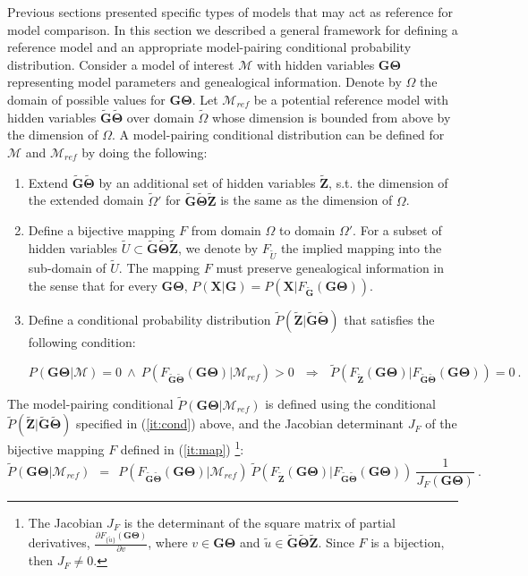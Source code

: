 \documentclass[11pt]{article}
\newcommand{\vect}[1]{\boldsymbol{\mathbf{#1}}}
\newcommand{\X}{\vect{X}}
\newcommand{\M}{\mathcal{M}}
\newcommand{\G}{\vect{G}}
\newcommand{\T}{\vect{\Theta}}
\newcommand{\GT}{\G\T}
\newcommand{\Mref}{\M_{ref}}
\newcommand{\Pref}{\widetilde{P}}
\newcommand{\Om}{\Omega}
\newcommand{\Gref}{\widetilde{\G}}
\newcommand{\Tref}{\widetilde{\T}}
\newcommand{\Z}{\vect{Z}}
\newcommand{\Zref}{\widetilde{\Z}}
\newcommand{\Omref}{\widetilde{\Om}}
\begin{document}
Previous sections presented specific types of models that may act as reference for model comparison.
%
In this section we described a general framework for defining a reference model and an appropriate model-pairing conditional
probability distribution.
%
Consider a model of interest $\M$ with hidden variables $\GT$ representing model parameters and genealogical information.
%
Denote by $\Om$  the domain of possible values for $\GT$.
%
Let $\Mref$ be a potential reference model with hidden variables $\Gref\Tref$ over domain $\Omref$ whose dimension is bounded from above by the
dimension of $\Om$.
%
A model-pairing conditional distribution can be defined for $\M$ and $\Mref$ by doing the following:
%
%
\begin{enumerate}
 \item Extend $\Gref\Tref$ by an additional set of hidden variables $\Zref$, s.t. the dimension of the extended domain $\Omref'$ for $\Gref\Tref\Zref$
 is the same as the dimension of $\Om$.
 \item \label{it:map} Define a bijective mapping $F$ from domain $\Om$ to domain $\Om'$.
 For a subset of hidden variables $\widetilde{U}\subset\Gref\Tref\Zref$, we denote by $F_{\widetilde{U}}$ the implied mapping into the sub-domain of $\widetilde{U}$.
 The mapping $F$ must preserve genealogical information in the sense that for every $\GT$, $P(\X|\G)=P(\X|F_{\Gref}(\GT))$.
  \item \label{it:cond} Define a conditional probability distribution $\Pref(\Zref|\Gref\Tref)$ that satisfies the following condition:
  \begin{small}
  \begin{equation}
  P(\GT|\M) = 0 ~\land~ P(F_{\Gref\Tref}(\GT)|\Mref) > 0 ~~~\Rightarrow~~~ \Pref(F_{\Zref}(\GT)|F_{\Gref\Tref}(\GT)) = 0 ~. \label{eq:pref-cond}
  \end{equation}
  \end{small}
\end{enumerate}

The model-pairing conditional $\Pref(\GT|\Mref)$ is defined using the conditional $\Pref(\Zref|\Gref\Tref)$
specified in (\ref{it:cond}) above, and the Jacobian determinant $J_F$ of the bijective mapping $F$ defined in (\ref{it:map})%
\footnote{The Jacobian $J_F$ is the determinant of the square matrix of partial derivatives, $\frac{\partial F_{\{\widetilde{u}\}}(\GT)}{\partial v}$,
where $v\in\GT$ and $\widetilde{u}\in\Gref\Tref\Zref$. Since $F$ is a bijection, then $J_F\neq 0$.}:
%
%
%
\begin{equation}\label{eq:pref_gen}
\Pref(\GT|\Mref) ~~=~~ P(F_{\Gref\Tref}(\GT)|\Mref)\ \Pref(F_{\Zref}(\GT)|F_{\Gref\Tref}(\GT))\ \frac{1} {J_F(\GT)}  ~.
\end{equation}
%
%
\end{document}
